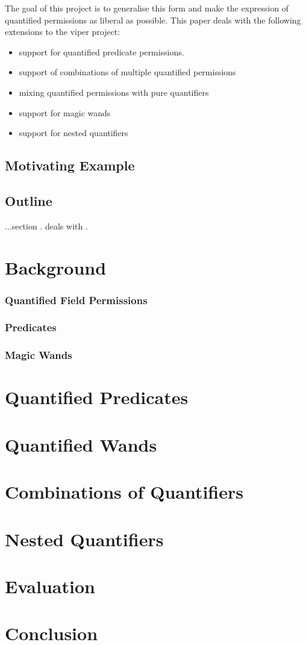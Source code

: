 \documentclass[12pt]{article}
\begin{document}
The goal of this project is to generalise this form and make the expression of quantified permissions as liberal as possible.
This paper deals with the following extensions to the viper project:
\begin{itemize}
\item support for quantified predicate permissions.
\item support of combinations of multiple quantified permissions
\item mixing quantified permissions with pure quantifiers
\item support for magic wands
\item support for nested quantifiers
\end{itemize}


\subsection{Motivating Example}

\subsection{Outline}

...section . deals with .

\section{Background}
\subsubsection{Quantified Field Permissions}
\subsubsection{Predicates}
\subsubsection{Magic Wands}
\section{Quantified Predicates}
\section{Quantified Wands}
\section{Combinations of Quantifiers}
\section{Nested Quantifiers}
\section{Evaluation}
\section{Conclusion}


\end{document}
